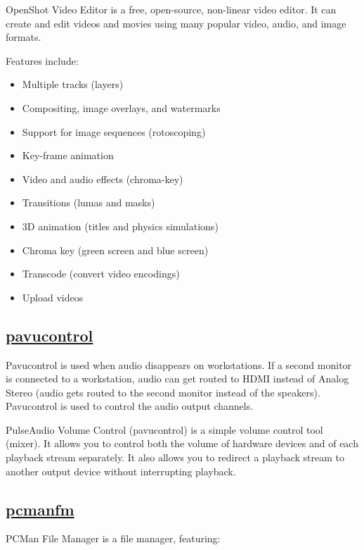  OpenShot Video Editor is a free, open-source, non-linear video editor. It
 can create and edit videos and movies using many popular video, audio, and
 image formats.
 
 Features include:

\begin{itemize}
 \item Multiple tracks (layers)
 \item Compositing, image overlays, and watermarks
 \item Support for image sequences (rotoscoping)
 \item Key-frame animation
 \item Video and audio effects (chroma-key)
 \item Transitions (lumas and masks)
 \item 3D animation (titles and physics simulations)
 \item Chroma key (green screen and blue screen)
 \item Transcode (convert video encodings)
 \item Upload videos
\end{itemize}

\subsection{\href{http://0pointer.de/lennart/projects/pavucontrol/}{pavucontrol}}

Pavucontrol is used when audio disappears on workstations.
If a second monitor is connected to a workstation, audio can get routed to
HDMI instead of Analog Stereo (audio gets routed to the second monitor instead
of the speakers). Pavucontrol is used to control the audio output channels.

 PulseAudio Volume Control (pavucontrol) is a simple volume
 control tool (mixer).
 It allows you to control both the volume of
 hardware devices and of each playback stream separately. It also allows
 you to redirect a playback stream to another output device without
 interrupting playback.

\subsection{\href{http://pcmanfm.sourceforge.net/}{pcmanfm}}

 PCMan File Manager is a file manager, featuring:
 
